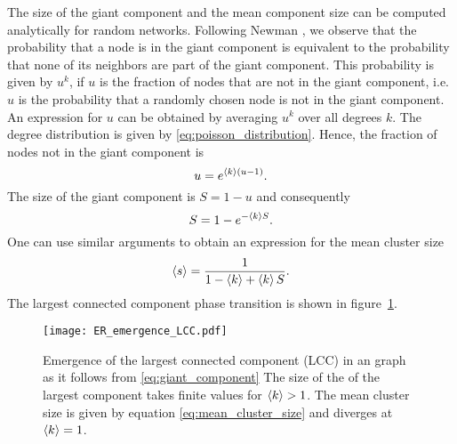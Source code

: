 The size of the giant component and the mean component size can be computed analytically for random networks.
Following Newman \citep{Newman2003}, we observe that the probability that a node is in the giant component is equivalent to the probability that none of its neighbors are part of the giant component.
This probability is given by $u^k$, if $u$ is the fraction of nodes that are not in the giant component, i.e. $u$ is the probability that a randomly chosen node is not in the giant component.
An expression for $u$ can be obtained by averaging $u^k$ over all degrees $k$.
The degree distribution is given by \eqref{eq:poisson_distribution}.
Hence, the fraction of nodes not in the giant component is
\[
u=e^{\left< k \right>(u-1)}.
\]
The size of the giant component is $S=1-u$ and consequently
\begin{equation}\label{eq:giant_component}
S=1-e^{-\left< k \right>S}.
\end{equation}
One can use similar arguments to obtain an expression for the mean cluster size \citep{Newman2003}
\begin{equation}\label{eq:mean_cluster_size}
\left< s \right>=\frac{1}{1-\left< k \right>+\left< k \right>S}.
\end{equation}
%
The largest connected component phase transition is shown in figure~\ref{fig:ER_lcc_emergence}.
\begin{SCfigure}
\texttt{[image: ER\_emergence\_LCC.pdf]}
\caption{Emergence of the largest connected component (LCC) in an \ER graph as it follows from \eqref{eq:giant_component}
The size of the of the largest component takes finite values for $\left< k \right>>1$.
The mean cluster size is given by equation \eqref{eq:mean_cluster_size} and diverges at $\left< k \right>=1$.
}
\label{fig:ER_lcc_emergence}
\end{SCfigure}
%

